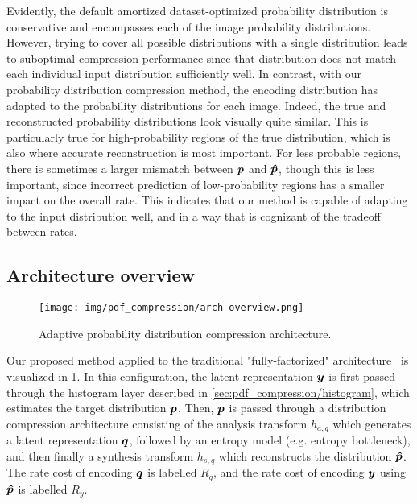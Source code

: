 Evidently, the default amortized dataset-optimized probability distribution is conservative and encompasses each of the image probability distributions.
However, trying to cover all possible distributions with a single distribution leads to suboptimal compression performance since that distribution does not match each individual input distribution sufficiently well.
In contrast, with our probability distribution compression method, the encoding distribution has adapted to the probability distributions for each image.
Indeed, the true and reconstructed probability distributions look visually quite similar.
This is particularly true for high-probability regions of the true distribution, which is also where accurate reconstruction is most important.
For less probable regions, there is sometimes a larger mismatch between ${\boldsymbol{p}}$ and ${\boldsymbol{\hat{p}}}$, though this is less important, since incorrect prediction of low-probability regions has a smaller impact on the overall rate.
This indicates that our method is capable of adapting to the input distribution well, and in a way that is cognizant of the tradeoff between rates.




\subsection{Architecture overview}
\label{sec:pdf_compression/architecture_overview}

\begin{figure}[htbp]
  \centering
  \texttt{[image: img/pdf\_compression/arch-overview.png]}
  \caption[Adaptive probability distribution compression architecture]{%
    Adaptive probability distribution compression architecture.%
  }
  \label{fig:pdf/arch}
\end{figure}

Our proposed method applied to the traditional "fully-factorized" architecture~\cite{balle2018variational} is visualized in \cref{fig:pdf/arch}.
In this configuration, the latent representation ${\boldsymbol{y}}$ is first passed through the histogram layer described in \cref{sec:pdf_compression/histogram}, which estimates the target distribution ${\boldsymbol{p}}$.
Then, ${\boldsymbol{p}}$ is passed through a distribution compression architecture consisting of the analysis transform $h_{a,q}$ which generates
a latent representation ${\boldsymbol{q}}$, followed by an entropy model (e.g. entropy bottleneck), and then finally a synthesis transform $h_{s,q}$ which reconstructs the distribution ${\boldsymbol{\hat{p}}}$.
The rate cost of encoding ${\boldsymbol{q}}$ is labelled $R_{q}$, and the rate cost of encoding ${\boldsymbol{y}}$ using ${\boldsymbol{\hat{p}}}$ is labelled $R_{y}$.




